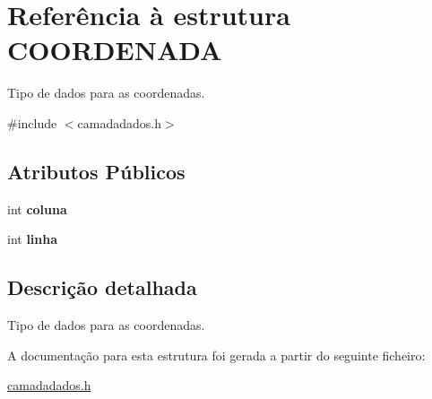\hypertarget{structCOORDENADA}{}\section{Referência à estrutura C\+O\+O\+R\+D\+E\+N\+A\+DA}
\label{structCOORDENADA}


Tipo de dados para as coordenadas.  




{\ttfamily \#include $<$camadadados.\+h$>$}

\subsection*{Atributos Públicos}
\begin{DoxyCompactItemize}
\item 
\mbox{\label{structCOORDENADA_adfbc8d4856ce807139fdf62e00aed29a}} 
int {\bfseries coluna}
\item 
\mbox{\label{structCOORDENADA_aefe14bcc5a066ac3b21500cc3d28c06f}} 
int {\bfseries linha}
\end{DoxyCompactItemize}


\subsection{Descrição detalhada}
Tipo de dados para as coordenadas. 

A documentação para esta estrutura foi gerada a partir do seguinte ficheiro\+:\begin{DoxyCompactItemize}
\item 
\hyperlink{camadadados_8h}{camadadados.\+h}\end{DoxyCompactItemize}
